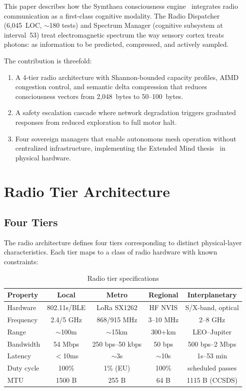 \documentclass[11pt,twocolumn]{article}
\begin{document}
This paper describes how the Symthaea consciousness engine~\cite{symthaea2026}
integrates radio communication as a first-class cognitive modality. The Radio
Dispatcher (6,045~LOC, $\sim$180 tests) and Spectrum Manager (cognitive
subsystem at interval~53) treat electromagnetic spectrum the way sensory cortex
treats photons: as information to be predicted, compressed, and actively sampled.

The contribution is threefold:
\begin{enumerate}[nosep]
  \item A 4-tier radio architecture with Shannon-bounded capacity profiles,
    AIMD congestion control, and semantic delta compression that reduces
    consciousness vectors from 2,048~bytes to 50--100~bytes.
  \item A safety escalation cascade where network degradation triggers
    graduated responses from reduced exploration to full motor halt.
  \item Four sovereign managers that enable autonomous mesh operation
    without centralized infrastructure, implementing the Extended Mind
    thesis~\cite{clark1998} in physical hardware.
\end{enumerate}

\section{Radio Tier Architecture}

\subsection{Four Tiers}

The radio architecture defines four tiers corresponding to distinct
physical-layer characteristics. Each tier maps to a class of radio hardware
with known constraints:

\begin{table}[H]
\centering
\caption{Radio tier specifications}
\label{tab:tiers}
\scriptsize
\begin{tabular}{@{}lcccc@{}}
\toprule
\textbf{Property} & \textbf{Local} & \textbf{Metro} & \textbf{Regional} & \textbf{Interplanetary} \\
\midrule
Hardware & 802.11s/BLE & LoRa SX1262 & HF NVIS & S/X-band, optical \\
Frequency & 2.4/5 GHz & 868/915 MHz & 3--10 MHz & 2--8 GHz \\
Range & $\sim$100m & $\sim$15km & 300+km & LEO--Jupiter \\
Bandwidth & 54 Mbps & 250 bps--50 kbps & 50 bps & 500 bps--2 Mbps \\
Latency & $<$10ms & $\sim$3s & $\sim$10s & 1s--53 min \\
Duty cycle & 100\% & 1\% (EU) & 100\% & scheduled passes \\
MTU & 1500 B & 255 B & 64 B & 1115 B (CCSDS) \\
\bottomrule
\end{tabular}
\end{table}
\end{document}
